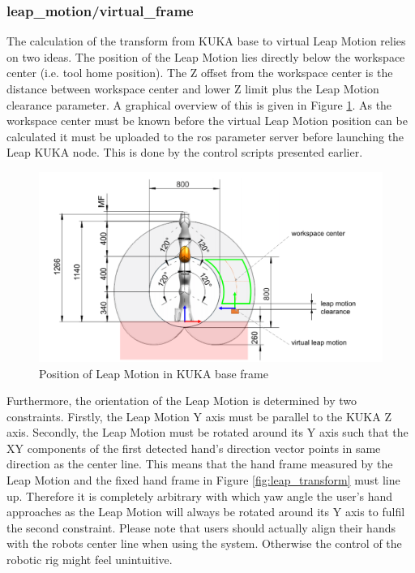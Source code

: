 \documentclass[headsepline,footinclude=false,fontsize=11pt,paper=a4,listof=totoc,bibliography=totoc,BCOR=12mm,DIV=14]{scrbook}
\begin{document}
\subsubsection{leap\_motion/virtual\_frame}

The calculation of the transform from KUKA base to virtual Leap Motion relies on two ideas. The position of the Leap Motion lies directly below the workspace center (i.e. tool home position). The Z offset from the workspace center is the distance between workspace center and lower Z limit plus the Leap Motion clearance parameter. A graphical overview of this is given in Figure \ref{fig:leap_pos}. As the workspace center must be known before the virtual Leap Motion position can be calculated it must be uploaded to the \gls{ros} parameter server before launching the Leap KUKA node. This is done by the control scripts presented earlier.

\begin{figure}[h]
    \centering
    \includegraphics[width=13cm]{images/leap_ws_side}
    \caption{Position of Leap Motion in KUKA base frame}
    \label{fig:leap_pos}
\end{figure}

Furthermore, the orientation of the Leap Motion is determined by two constraints. Firstly, the Leap Motion Y axis must be parallel to the KUKA Z axis. Secondly, the Leap Motion must be rotated around its Y axis such that the XY components of the first detected hand's direction vector points in same direction as the center line. This means that the hand frame measured by the Leap Motion and the fixed hand frame in Figure \ref{fig:leap_transform} must line up. Therefore it is completely arbitrary with which yaw angle the user's hand approaches as the Leap Motion will always be rotated around its Y axis to fulfil the second constraint. Please note that users should actually align their hands with the robots center line when using the system. Otherwise the control of the robotic rig might feel unintuitive.
\end{document}

